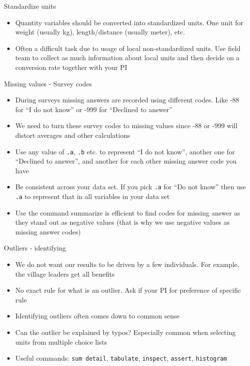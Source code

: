 \documentclass[aspectratio=169]{beamer}
\begin{document}
\begin{frame}{Standardize units }
	\begin{itemize}
		\item Quantity variables should be converted into standardized units. One unit for weight (usually kg), length/distance (usually meter), etc.
		\item Often a difficult task due to usage of local non-standardized units. Use field team to collect as much information about local units and then decide on a conversion rate together with your PI
	\end{itemize}
\end{frame}


\begin{frame}{Missing values - Survey codes}
	\begin{itemize}
		\item During surveys missing answers are recorded using different codes. Like -88 for “I do not know” or -999 for “Declined to answer”
		\item We need to turn these survey codes to missing values since -88 or -999 will distort averages and other calculations
		\item Use any value of \texttt{.a}, \texttt{.b} etc. to represent “I do not know”, another one for “Declined to answer”, and another for each other missing answer code you have
		\item Be consistent across your data set. If you pick \texttt{.a} for “Do not know” then use \texttt{.a} to represent that in all variables in your data set
		\item Use the command summarize is efficient to find codes for missing answer as they stand out as negative values (that is why we use negative values as missing answer codes)
	\end{itemize}
\end{frame}



\begin{frame}{Outliers - identifying}
	\begin{itemize}
		\item We do not want our results to be driven by a few individuals. For example, the village leaders get all benefits
		\item No exact rule for what is an outlier.  Ask if your PI for preference of specific rule
		\item Identifying outliers often comes down to common sense
		\item Can the outlier be explained by typos? Especially common when selecting units from multiple choice lists
		\item Useful commands: \texttt{sum detail}, \texttt{tabulate}, \texttt{inspect}, \texttt{assert}, \texttt{histogram}
	\end{itemize}
\end{frame}
\end{document}
